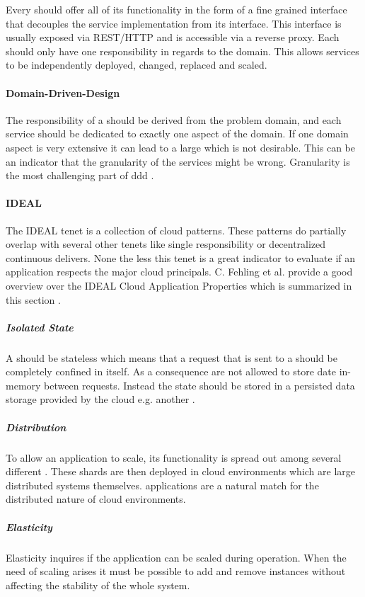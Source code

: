 Every \ms{} should offer all of its functionality in the form of a fine grained
interface that decouples the service implementation from its interface. This
interface is usually exposed via REST/HTTP and is accessible via a reverse
proxy. Each \ms{} should only have one responsibility in regards to the domain.
This allows services to be independently deployed, changed, replaced and scaled.

\paragraph{Domain-Driven-Design}

The responsibility of a \ms{} should be derived from the problem domain, and
each service should be dedicated to exactly one aspect of the domain. If one
domain aspect is very extensive it can lead to a large \ms{} which is not
desirable. This can be an indicator that the granularity of the services might
be wrong. Granularity is the most challenging part of \gls{ddd}
\cite{millett2015patterns}.

\paragraph{IDEAL}

The IDEAL tenet is a collection of cloud patterns. These patterns do partially
overlap with several other tenets like single responsibility or decentralized
continuous delivers. None the less this tenet is a great indicator to
evaluate if an application respects the major cloud principals. C. Fehling et
al. provide a good overview over the  IDEAL Cloud Application Properties
which is summarized in this section \cite{fehling2015cloud}.

\subparagraph{Isolated State}
A \ms{} should be stateless which means that a request that is sent to a \ms{}
should be completely confined in itself. As a consequence \mss{} are not allowed
to store date in-memory between requests. Instead the state should be stored in
a persisted data storage provided by the cloud e.g. another \ms{}.

\subparagraph{Distribution}
To allow an application to scale, its functionality is spread out among several
different \mss{}. These shards are then deployed in cloud environments which are
large distributed systems themselves. \ms{} applications are a natural match for
the distributed nature of cloud environments.

\subparagraph{Elasticity}
Elasticity inquires if the application can be scaled during operation. When
the need of scaling arises it must be possible to add and remove \ms{} instances
without affecting the stability of the whole system.

